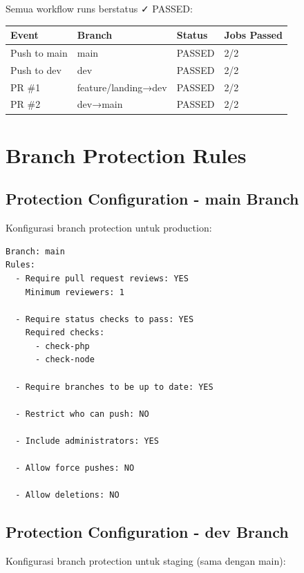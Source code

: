 \documentclass[a4paper,oneside,11pt]{book}
\begin{document}
Semua workflow runs berstatus ✓ PASSED:

\begin{center}
\begin{tabular}{|l|l|l|l|}
\hline
\textbf{Event} & \textbf{Branch} & \textbf{Status} & \textbf{Jobs Passed} \\
\hline
Push to main & main & PASSED & 2/2 \\
\hline
Push to dev & dev & PASSED & 2/2 \\
\hline
PR \#1 & feature/landing→dev & PASSED & 2/2 \\
\hline
PR \#2 & dev→main & PASSED & 2/2 \\
\hline
\end{tabular}
\end{center}

\newpage

\section{Branch Protection Rules}

\subsection{Protection Configuration - main Branch}

Konfigurasi branch protection untuk production:

\begin{lstlisting}[style=yamlStyle, caption={Branch Protection Rules - main}, label={kode:mainprotection}]
Branch: main
Rules:
  - Require pull request reviews: YES
    Minimum reviewers: 1
  
  - Require status checks to pass: YES
    Required checks:
      - check-php
      - check-node
  
  - Require branches to be up to date: YES
  
  - Restrict who can push: NO
  
  - Include administrators: YES
  
  - Allow force pushes: NO
  
  - Allow deletions: NO
\end{lstlisting}

\subsection{Protection Configuration - dev Branch}

Konfigurasi branch protection untuk staging (sama dengan main):
\end{document}
